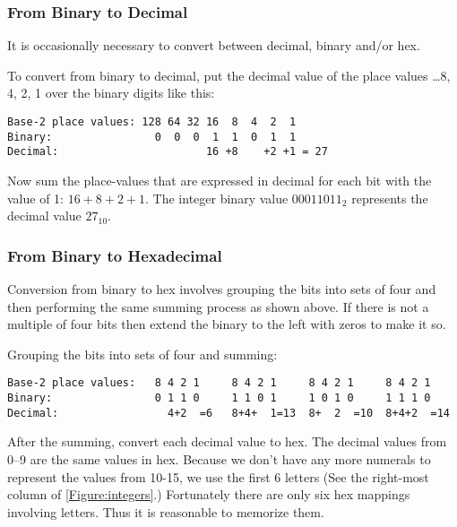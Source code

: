 \subsubsection{From Binary to Decimal}
\label{section:bindec}

It is occasionally necessary to convert between decimal,
binary and/or hex.

To convert from binary to decimal, put the decimal value of the place values 
{\ldots8, 4, 2, 1} over the binary digits like this:

\begin{verbatim}
Base-2 place values: 128 64 32 16  8  4  2  1
Binary:                0  0  0  1  1  0  1  1
Decimal:                       16 +8    +2 +1 = 27
\end{verbatim}

Now sum the place-values that are expressed in decimal for each 
bit with the value of 1: $16+8+2+1$.  The integer binary value
$00011011_2$ represents the decimal value $27_{10}$.

\subsubsection{From Binary to Hexadecimal}
\label{section:binhex}

Conversion from binary to hex involves grouping the bits into
sets of four and then performing the same summing process as 
shown above.  If there is not a multiple of four bits then
extend the binary to the left with zeros to make it so.

Grouping the bits into sets of four and summing:

\begin{verbatim}
Base-2 place values:   8 4 2 1     8 4 2 1     8 4 2 1     8 4 2 1
Binary:                0 1 1 0     1 1 0 1     1 0 1 0     1 1 1 0
Decimal:                 4+2  =6   8+4+  1=13  8+  2  =10  8+4+2  =14
\end{verbatim}

After the summing, convert each decimal value to hex.  The decimal
values from 0--9 are the same values in hex.  Because we don't have any
more numerals to represent the values from 10-15, we use the first 6
letters (See the right-most column of \autoref{Figure:integers}.)
Fortunately there are only six hex mappings involving letters.  Thus 
it is reasonable to memorize them.

